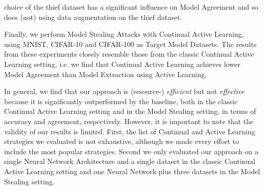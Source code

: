 choice of the thief dataset has a significant influence on Model Agreement and so does (not) using data augmentation on the thief dataset. \par
Finally, we perform Model Stealing Attacks with Continual Active Learning, using MNIST, CIFAR-10 and CIFAR-100 as Target Model Datasets.
The results from these experiments closely resemble those from the classic Continual Active Learning setting, i.e. we find that Continual
Active Learning achieves lower Model Agreement than Model Extraction using Active Learning. \par
In general, we find that our approach is (resource-) \textit{efficient} but not \textit{effective} because it is significantly outperformed
by the baseline, both in the classic Continual Active Learning setting and in the Model Stealing setting, in terms of accuracy and agreement,
respectively. However, it is important to note that the validity of our results is limited. First, the list of Continual and Active Learning
strategies we evaluated is not exhaustive, although we made every effort to include the most popular strategies. Second we only evaluated our
approach on a single Neural Network Architecture and a single dataset in the classic Continual Active Learning setting and one Neural Network
plus three datasets in the Model Stealing setting.
